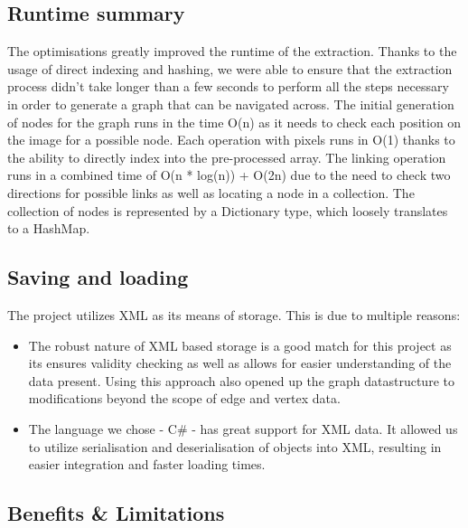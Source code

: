 \documentclass[main.tex]{subfiles}
\begin{document}
	\subsection{Runtime summary}
	The optimisations greatly improved the runtime of the extraction. Thanks to the usage of direct indexing and hashing, we were able to ensure that the extraction process didn't take longer than a few seconds to perform all the steps necessary in order to generate a graph that can be navigated across. The initial generation of nodes for the graph runs in the time O(n) as it needs to check each position on the image for a possible node. Each operation with pixels runs in O(1) thanks to the ability to directly index into the pre-processed array. The linking operation runs in a combined time of O(n * log(n)) + O(2n) due to the need to check two directions for possible links as well as locating a node in a collection. The collection of nodes is represented by a Dictionary type, which loosely translates to a HashMap. 
	\subsection{Saving and loading}
	The project utilizes XML as its means of storage. This is due to multiple reasons:
	
	\begin{itemize}
		\item The robust nature of XML based storage is a good match for this project as its ensures validity checking as well as allows for easier understanding of the data present. Using this approach also opened up the graph datastructure to modifications beyond the scope of edge and vertex data. 
		\item The language we chose - C\# - has great support for XML data. It allowed us to utilize serialisation and deserialisation of objects into XML, resulting in easier integration and faster loading times.
	\end{itemize}
	\subsection{Benefits \& Limitations}
\end{document}
